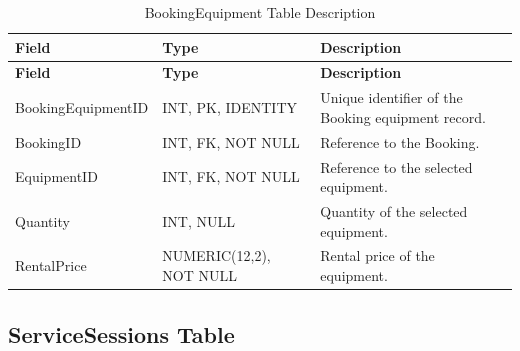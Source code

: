 \begin{longtable}{
		|>{\raggedright\arraybackslash}p{3.2cm}|
		>{\raggedright\arraybackslash}p{4.2cm}|
		>{\raggedright\arraybackslash}p{5.0cm}|
	}
	\caption{BookingEquipment Table Description}
	\label{tab:booking-equipment}\\
	\hline
	\textbf{Field} & \textbf{Type} & \textbf{Description} \\ \hline
	\endfirsthead
	\hline
	\textbf{Field} & \textbf{Type} & \textbf{Description} \\ \hline
	\endhead
	
	BookingEquipmentID & INT, PK, IDENTITY &
	Unique identifier of the Booking equipment record. \\ \hline
	
	BookingID & INT, FK, NOT NULL &
	Reference to the Booking. \\ \hline
	
	EquipmentID & INT, FK, NOT NULL &
	Reference to the selected equipment. \\ \hline
	
	Quantity & INT, NULL &
	Quantity of the selected equipment. \\ \hline
	
	RentalPrice & NUMERIC(12,2), NOT NULL &
	Rental price of the equipment. \\ \hline
	
\end{longtable}


\subsection{ServiceSessions Table}

